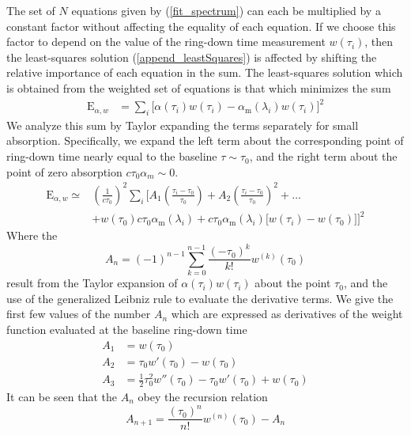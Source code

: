 The set of $N$ equations given by (\ref{fit_spectrum}) can each be multiplied by a constant factor without affecting the equality of each equation. If we choose this factor to depend on the value of the ring-down time measurement $w(\tau_i)$, then the least-squares solution (\ref{append_leastSquares}) is affected by shifting the relative importance of each equation in the sum. The least-squares solution which is obtained from the weighted set of equations is that which minimizes the sum
\begin{align}
	\mathrm{E}_{\alpha,w} &= \sum_{i}  \Big[\alpha(\tau_i)w(\tau_i) - \alpha_\text{m}(\lambda_i)w(\tau_i) \Big]^2
\end{align}
We analyze this sum by Taylor expanding the terms separately for small absorption. Specifically, we expand the left term about the corresponding point of ring-down time nearly equal to the baseline $\tau \sim \tau_0$, and the right term about the point of zero absorption $c\tau_0\alpha_m \sim 0$.
\begin{align} \label{expan_alphaW}
	\mathrm{E}_{\alpha,w} \simeq&
	\left(\frac{1}{c\tau_0}\right)^2 \sum_{i} \Bigg[
	A_1\left(\frac{\tau_i-\tau_0}{\tau_0}\right) + A_2\left(\frac{\tau_i-\tau_0}{\tau_0}\right)^2 + \ldots \nonumber \\
	&+ w(\tau_0)c\tau_0\alpha_\mathrm{m}(\lambda_i) + c\tau_0\alpha_\mathrm{m}(\lambda_i) \Big[w(\tau_i) - w(\tau_0)\Big]
	\Bigg]^2
\end{align}
Where the
\begin{equation}
	A_n = (-1)^{n-1}\sum_{k=0}^{n-1}\frac{(-\tau_0)^k}{k!}w^{(k)}(\tau_0)
\end{equation}
result from the Taylor expansion of $\alpha(\tau_i)w(\tau_i)$ about the point $\tau_0$, and the use of the generalized Leibniz rule to evaluate the derivative terms. We give the first few values of the number $A_n$ which are expressed as derivatives of the weight function evaluated at the baseline ring-down time
\begin{align}
	A_1 &= w(\tau_0) \\
	A_2 &= \tau_0w'(\tau_0) - w(\tau_0) \\
	A_3 &= \frac{1}{2}\tau_0^2w''(\tau_0) - \tau_0w'(\tau_0) + w(\tau_0)
\end{align}
It can be seen that the $A_n$ obey the recursion relation
\begin{equation} \label{A_recurs}
	A_{n+1} =  \frac{(\tau_0)^n}{n!}w^{(n)}(\tau_0) - A_n
\end{equation}

